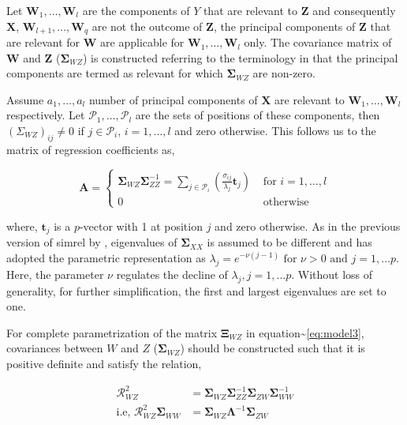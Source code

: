 \documentclass[12pt,a4paperpaper,authoryear]{elsarticle} %
\begin{document}
Let \(\mathbf{W}_1, \ldots, \mathbf{W}_l\) are the components of \(Y\)
that are relevant to \(\mathbf{Z}\) and consequently \(\mathbf{X}\),
\(\mathbf{W}_{l+1}, \ldots, \mathbf{W}_q\) are not the outcome of
\(\mathbf{Z}\), the principal components of \(\mathbf{Z}\) that are
relevant for \(\mathbf{W}\) are applicable for
\(\mathbf{W}_1, \ldots, \mathbf{W}_l\) only. The covariance matrix of
\(\mathbf{W}\) and \(\mathbf{Z}\) (\(\boldsymbol{\Sigma}_{WZ}\)) is
constructed referring to the terminology in
\citet{helland1994comparison} that the principal components are termed
as relevant for which \(\boldsymbol{\Sigma}_{WZ}\) are non-zero.

Assume \(a_1, \ldots, a_l\) number of principal components of
\(\mathbf{X}\) are relevant to \(\mathbf{W}_1, \ldots, \mathbf{W}_l\)
respectively. Let \(\mathcal{P}_1, \ldots, \mathcal{P}_l\) are the sets
of positions of these components, then \((\Sigma_{WZ})_{ij} \ne 0\) if
\(j \in \mathcal{P}_i\), \(i = 1, \ldots, l\) and zero otherwise. This
follows us to the matrix of regression coefficients as,

\begin{equation}
  \mathbf{A} =
  \begin{cases}
    \boldsymbol{\Sigma}_{WZ}\boldsymbol{\Sigma}_{ZZ}^{-1} =
    \sum_{j \in \mathcal{P}_i}{\left(\frac{\sigma_{ij}}{\lambda_j} \mathbf{t}_j\right)} & \text{ for } i = 1, \ldots, l \\
    0 & \text{ otherwise }
  \end{cases}
\end{equation}

where, \(\mathbf{t}_j\) is a \(p\)-vector with 1 at position \(j\) and
zero otherwise. As in the previous version of simrel by
\citet{saebo2015simrel}, eigenvalues of \(\boldsymbol{\Sigma}_{XX}\) is
assumed to be different and has adopted the parametric representation as
\(\lambda_j = e^{-\nu(j - 1)}\text{ for } \nu>0 \text{ and } j = 1, \ldots p\).
Here, the parameter \(\nu\) regulates the decline of
\(\lambda_j, j = 1, \ldots p\). Without loss of generality, for further
simplification, the first and largest eigenvalues are set to one.

For complete parametrization of the matrix \(\boldsymbol{\Xi}_{WZ}\) in
equation\textasciitilde{}\eqref{eq:model3}, covariances between \(W\) and
\(Z\) (\(\boldsymbol{\Sigma}_{WZ}\)) should be constructed such that it
is positive definite and satisfy the relation,

\begin{align}
  \boldsymbol{\mathcal{R}}^{2}_{WZ}                                      &=
    \boldsymbol{\Sigma}_{WZ}\boldsymbol{\Sigma}^{-1}_{ZZ}\boldsymbol{\Sigma}_{ZW}\boldsymbol{\Sigma}_{WW}^{-1} \nonumber \\
  \text{i.e, } \boldsymbol{\mathcal{R}}_{WZ}^{2}\boldsymbol{\Sigma}_{WW} &=
    \boldsymbol{\Sigma}_{WZ}\boldsymbol{\Lambda}^{-1}\boldsymbol{\Sigma}_{ZW}
\label{eq:sigmaRhoRelation}
\end{align}
\end{document}
